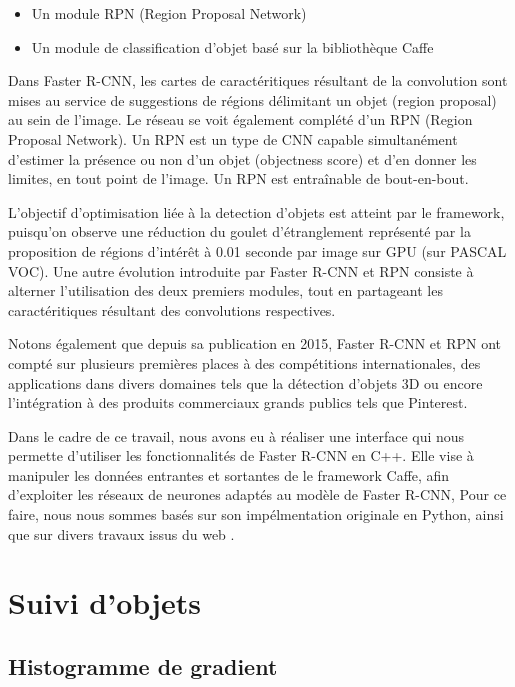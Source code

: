       \begin{itemize}
       \item Un module RPN (Region Proposal Network)
       \item Un module de classification d'objet basé sur la bibliothèque Caffe
      \end{itemize}
      
      Dans Faster R-CNN, les cartes de caractéritiques résultant de la convolution sont mises au service de suggestions de régions délimitant un objet (region proposal) au sein de l'image. Le réseau se voit également
      complété d'un RPN (Region Proposal Network). Un RPN est un type de CNN capable simultanément d'estimer la présence ou non d'un objet (objectness score) et d'en donner les limites, en tout point de l'image.
      Un RPN est entraînable de bout-en-bout. 
      
      L'objectif d'optimisation liée à la detection d'objets est atteint par le framework, 
      puisqu'on observe une réduction du goulet d'étranglement représenté par la proposition de régions d'intérêt à 0.01 seconde par image sur GPU (sur PASCAL VOC). 
      Une autre évolution introduite par Faster R-CNN et RPN consiste à alterner l'utilisation des deux premiers modules, tout en partageant les caractéritiques résultant des convolutions respectives. 
      
      Notons également que depuis sa publication en 2015, Faster R-CNN et RPN ont compté sur plusieurs premières places à des compétitions internationales, des applications dans divers domaines tels que la détection
      d'objets 3D ou encore l'intégration à des produits commerciaux grands publics tels que Pinterest. 
      
      Dans le cadre de ce travail, nous avons eu à réaliser une interface qui nous permette d'utiliser les fonctionnalités de Faster R-CNN en C++. 
      Elle vise à manipuler les données entrantes et sortantes de le framework Caffe, afin d'exploiter les réseaux de neurones adaptés au modèle de Faster R-CNN,   
      Pour ce faire, nous nous sommes basés sur son impélmentation originale en Python, ainsi que sur divers travaux issus du web \cite{Bib_FasterRCNN_encapsulation}.  
      
      \section{Suivi d'objets}

	\subsection{Histogramme de gradient}

